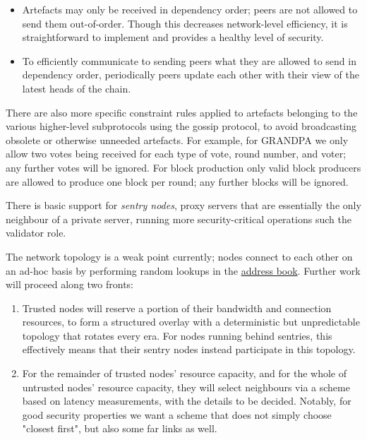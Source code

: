 \begin{itemize}
\item Artefacts may only be received in dependency order; peers are not allowed to send them out-of-order. Though this decreases network-level efficiency, it is straightforward to implement and provides a healthy level of security.
\item To efficiently communicate to sending peers what they are allowed to send in dependency order, periodically peers update each other with their view of the latest heads of the chain.
\end{itemize}

There are also more specific constraint rules applied to artefacts belonging to the various higher-level subprotocols using the gossip protocol, to avoid broadcasting obsolete or otherwise unneeded artefacts. For example, for GRANDPA we only allow two votes being received for each type of vote, round number, and voter; any further votes will be ignored. For block production only valid block producers are allowed to produce one block per round; any further blocks will be ignored.

There is basic support for \emph{sentry nodes}, proxy servers that are essentially the only neighbour of a private server, running more security-critical operations such the validator role.

The network topology is a weak point currently; nodes connect to each other on an ad-hoc basis by performing random lookups in the \hyperref[sec:net_lowlevel]{address book}. Further work will proceed along two fronts:

\begin{enumerate}
\item Trusted nodes will reserve a portion of their bandwidth and connection resources, to form a structured overlay with a deterministic but unpredictable topology that rotates every era. For nodes running behind sentries, this effectively means that their sentry nodes instead participate in this topology.

\item For the remainder of trusted nodes' resource capacity, and for the whole of untrusted nodes' resource capacity, they will select neighbours via a scheme based on latency measurements, with the details to be decided. Notably, for good security properties we want a scheme that does not simply choose "closest first", but also some far links as well.
\end{enumerate}

